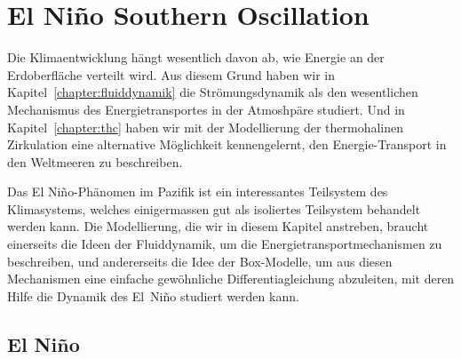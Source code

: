 %
%
%
\chapter{El Niño Southern Oscillation\label{chapter:elnino}}
Die Klimaentwicklung hängt wesentlich davon ab, wie Energie an der
Erdoberfläche verteilt wird.
Aus diesem Grund haben wir in Kapitel~\ref{chapter:fluiddynamik}
die Strömungsdynamik als den wesentlichen Mechanismus des 
Energietransportes in der Atmoshpäre studiert.
Und in Kapitel~\ref{chapter:thc} haben wir mit der Modellierung der
thermohalinen Zirkulation eine alternative Möglichkeit kennengelernt,
den Energie-Transport in den Weltmeeren zu beschreiben.

Das El Niño-Phänomen im Pazifik ist ein interessantes Teilsystem des
Klimasystems, welches einigermassen gut als isoliertes Teilsystem 
behandelt werden kann.
Die Modellierung, die wir in diesem Kapitel anstreben, braucht
einerseits die Ideen der Fluiddynamik, um die Energietransportmechanismen
zu beschreiben, und andererseits die Idee der Box-Modelle, um aus diesen
Mechanismen eine einfache gewöhnliche Differentiagleichung abzuleiten,
mit deren Hilfe die Dynamik des El~Niño studiert werden kann.

\section{El Niño}





